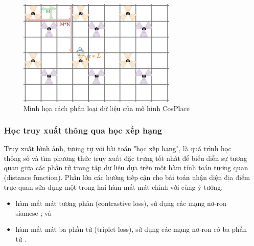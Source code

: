 \begin{figure}[H]
    \centering
    \includegraphics[width=0.7\textwidth]{pics/Chapter2/cosplaceclassify.png}
    \caption{Minh họa cách phân loại dữ liệu của mô hình CosPlace \cite{berton2022rethinking}}
\end{figure}

\subsubsection{Học truy xuất thông qua học xếp hạng}

Truy xuất hình ảnh, tương tự với bài toán "học xếp hạng", là quá trình học thông số và tìm phương thức truy xuất đặc trưng tốt nhất để biểu diễn sự tương quan giữa các phần tử trong tập dữ liệu dựa trên một hàm tính toán tương quan (distance function). Phần lớn các hướng tiếp cận cho bài toán nhận diện địa điểm trực quan sửa dụng một trong hai hàm mất mát chính với cùng ý tưởng:

\begin{itemize}
    \item hàm mất mát tương phản (contrastive loss), sử dụng các mạng nơ-ron siamese \cite{ong2017siamese, GeM, randenovic2016BoW}; và
    \item hàm mất mát ba phần tử (triplet loss), sử dụng các mạng nơ-ron có ba phần tử \cite{arandjelovic2016netvlad, gordo2016deep, gordo2017endtoend, wang2014learning, jin2017learned, zheng2018sift}.
\end{itemize}

